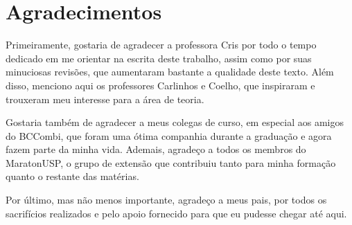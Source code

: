 



\chapter*{Agradecimentos}

Primeiramente, gostaria de agradecer a professora Cris por todo o tempo dedicado em me orientar na escrita deste trabalho, assim como por suas minuciosas revisões, que aumentaram bastante a qualidade deste texto. Além disso, menciono aqui os professores Carlinhos e Coelho, que inspiraram e trouxeram meu interesse para a área de teoria.

Gostaria também de agradecer a meus colegas de curso, em especial aos amigos do BCCombi, que foram uma ótima companhia durante a graduação e agora fazem parte da minha vida. Ademais, agradeço a todos os membros do MaratonUSP, o grupo de extensão que contribuiu tanto para minha formação quanto o restante das matérias.

Por último, mas não menos importante, agradeço a meus pais, por todos os sacrifícios realizados e pelo apoio fornecido para que eu pudesse chegar até aqui.

\printResumoAbstract



